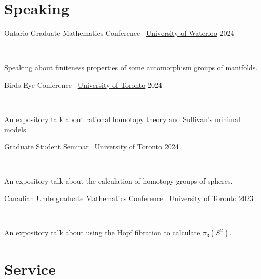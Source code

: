 \documentclass[]{style}
\begin{document}
\section{Speaking}

\begin{entrylist}

\vspace{1mm}

\entry
{Ontario Graduate Mathematics Conference \ {\normalfont \underline{University of Waterloo}}}
{2024}
{ ~ \vspace{-2.5mm}

Speaking about finiteness properties of some automorphism groups of manifolds.}

\entry
{Birds Eye Conference \ {\normalfont \underline{University of Toronto}}}
{2024}
{ ~ \vspace{-2.5mm}

An expository talk about rational homotopy theory and Sullivan's minimal models.}

\entry
{Graduate Student Seminar \ {\normalfont \underline{University of Toronto}}}
{2024}
{ ~ \vspace{-2.5mm}

An expository talk about the calculation of homotopy groups of spheres.}

\entry
{Canadian Undergraduate Mathematics Conference \ {\normalfont \underline{University of Toronto}}}
{2023}
{ ~ \vspace{-2.5mm}

An expository talk about using the Hopf fibration to calculate $\pi_3(S^2)$.}

\end{entrylist}

\section{Service}
\end{document}

